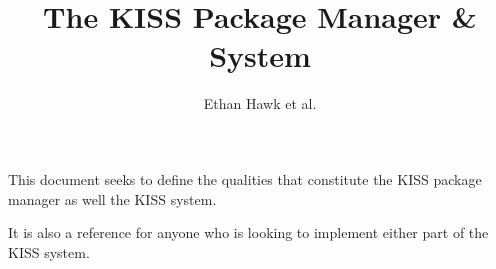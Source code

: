 \documentclass{article}
\title{The KISS Package Manager \& System}
\author{Ethan Hawk et al.}
\begin{document}
\maketitle
\tableofcontents

\newpage
This document seeks to define the qualities that constitute the
KISS package manager as well the KISS system.

It is also a reference for anyone who is looking to implement
either part of the KISS system.






\end{document}

